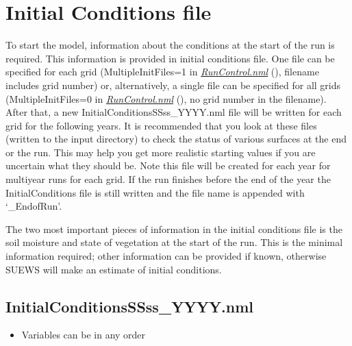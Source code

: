 \documentclass[letterpaper,10pt,english]{sphinxmanual}
\begin{document}
\section{Initial Conditions file}
\label{\detokenize{input_files/Initial_Conditions::doc}}\label{\detokenize{input_files/Initial_Conditions:initial-conditions-file}}
To start the model, information about the conditions at the start of the
run is required. This information is provided in initial conditions
file. One file can be specified for each grid (MultipleInitFiles=1 in
{\hyperref[\detokenize{input_files/Initial_Conditions:RunControl.nml}]{\emph{RunControl.nml}}} (), filename includes grid number) or,
alternatively, a single file can be specified for all grids
(MultipleInitFiles=0 in {\hyperref[\detokenize{input_files/Initial_Conditions:RunControl.nml}]{\emph{RunControl.nml}}} (), no grid
number in the filename). After that, a new
InitialConditionsSSss\_YYYY.nml file will be written for each grid for
the following years. It is recommended that you look at these files
(written to the input directory) to check the status of various surfaces
at the end or the run. This may help you get more realistic starting
values if you are uncertain what they should be. Note this file will be
created for each year for multiyear runs for each grid. If the run
finishes before the end of the year the InitialConditions file is still
written and the file name is appended with ‘\_EndofRun’.

The two most important pieces of information in the initial conditions
file is the soil moisture and state of vegetation at the start of the
run. This is the minimal information required; other information can be
provided if known, otherwise SUEWS will make an estimate of initial
conditions.


\subsection{InitialConditionsSSss\_YYYY.nml}
\label{\detokenize{input_files/Initial_Conditions:initialconditionsssss-yyyy-nml}}\begin{itemize}
\item {} 
Variables can be in any order

\end{itemize}
\end{document}
